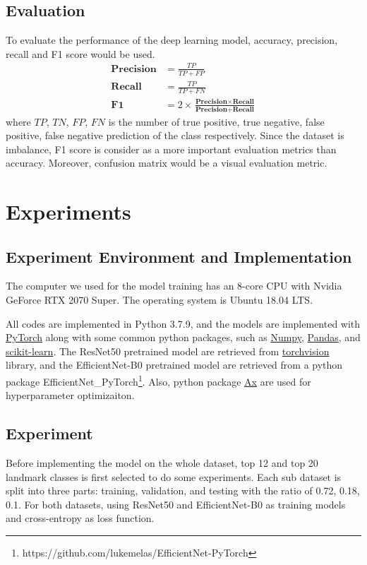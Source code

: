 \documentclass[10pt,twocolumn,letterpaper]{article}
\begin{document}
\subsection{Evaluation}
To evaluate the performance of the deep learning model, accuracy, precision, recall and F1 score would be used.
\begin{align}
    \textbf{Precision} &= \frac{TP}{TP+FP}\\
    \textbf{Recall} &= \frac{TP}{TP+FN}\\
    \textbf{F1} &= 2 \times \frac{\textbf{Precision} \times \textbf{Recall}}{\textbf{Precision} + \textbf{Recall}}
\end{align}
where $TP$, $TN$, $FP$, $FN$ is the number of true positive, true negative, false positive, false negative prediction of the class respectively. Since the dataset is imbalance, F1 score is consider as a more important evaluation metrics than accuracy. Moreover, confusion matrix would be a visual evaluation metric.

\section{Experiments}

\subsection{Experiment Environment and Implementation}
The computer we used for the model training has an 8-core CPU with Nvidia GeForce RTX 2070 Super. The operating system is Ubuntu 18.04 LTS.

All codes are implemented in Python 3.7.9, and the models are implemented with \href{https://pytorch.org/}{PyTorch} \cite{paszke_pytorch_2019} along with some common python packages, such as \href{https://numpy.org/}{Numpy}, \href{https://pandas.pydata.org/}{Pandas}, and \href{https://scikit-learn.org/}{scikit-learn}. The ResNet50 pretrained model are retrieved from \href{https://pytorch.org/docs/stable/torchvision/index.html}{torchvision} library, and the EfficientNet-B0 pretrained model are retrieved from a python package EfficientNet\_PyTorch\footnote{https://github.com/lukemelas/EfficientNet-PyTorch}. Also, python package \href{https://ax.dev/}{Ax} are used for hyperparameter optimizaiton.


\subsection{Experiment}
Before implementing the model on the whole dataset, top 12 and top 20 landmark classes is first selected to do some experiments. Each sub dataset is split into three parts: training, validation, and testing with the ratio of 0.72, 0.18, 0.1. For both datasets, using ResNet50 and EfficientNet-B0 as training models and cross-entropy as loss function.
\end{document}
